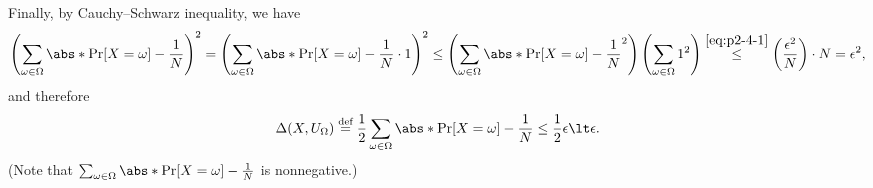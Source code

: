\begin{answer}[iv]
    Finally, by Cauchy–Schwarz inequality, we have
    \[
        \left(\sum_{\omega\in \Omega} \abs*{\Pr[X=\omega]-\frac{1}{N}} \right)^2
        = \left(\sum_{\omega\in \Omega} \abs*{\Pr[X=\omega]-\frac{1}{N}} \cdot 1 \right)^2
        \le \left(\sum_{\omega\in \Omega} \abs*{\Pr[X=\omega]-\frac{1}{N}}^2\right) \left(\sum_{\omega\in \Omega} 1^2\right)
        \stackrel{\eqref{eq:p2-4-1}}\le  \left(\frac{\epsilon^2}{N}\right)\cdot  N  = \epsilon^2,
    \]
    and therefore
    \[
        \Delta(X, U_\Omega)\stackrel{\textrm{def}}= \frac{1}{2} \sum_{\omega\in\Omega}\abs*{\Pr[X=\omega]-\frac{1}{N}}
        \le \frac{1}{2} \epsilon \lt \epsilon.
    \]
    (Note that $\sum_{\omega\in\Omega}\abs*{\Pr[X=\omega]-\frac{1}{N}}$ is nonnegative.)
\end{answer}